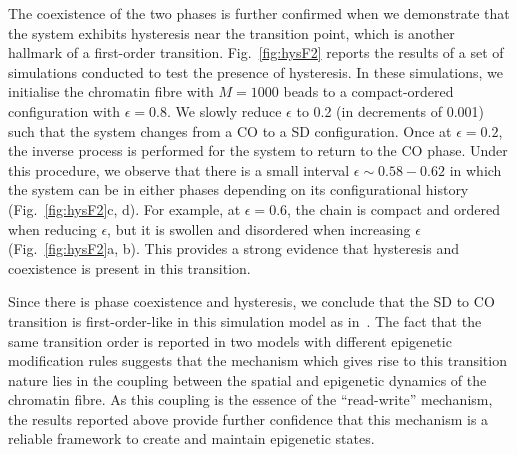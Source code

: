 \documentclass[12pt]{article}
\begin{document}
The coexistence of the two phases is further confirmed when we demonstrate that the system exhibits hysteresis near the transition point, which is another hallmark of a first-order transition. Fig.~\ref{fig:hysF2} reports the results of a set of simulations conducted to test the presence of hysteresis. In these simulations, we initialise the chromatin fibre with $M = 1000$ beads to a compact-ordered configuration with $\epsilon = 0.8$. We slowly reduce $\epsilon$ to 0.2 (in decrements of 0.001) such that the system changes from a CO to a SD configuration. Once at $\epsilon = 0.2$, the inverse process is performed for the system to return to the CO phase. Under this procedure, we observe that there is a small interval $\epsilon \sim 0.58 - 0.62$ in which the system can be in either phases depending on its configurational history (Fig.~\ref{fig:hysF2}c, d). For example, at $\epsilon = 0.6$, the chain is compact and ordered when reducing $\epsilon$, but it is swollen and disordered when increasing $\epsilon$ (Fig.~\ref{fig:hysF2}a, b). This provides a strong evidence that hysteresis and coexistence is present in this transition.

Since there is phase coexistence and hysteresis, we conclude that the SD to CO transition is first-order-like in this simulation model as in~\cite{michieletto2016}. The fact that the same transition order is reported in two models with different epigenetic modification rules suggests that the mechanism which gives rise to this transition nature lies in the coupling between the spatial and epigenetic dynamics of the chromatin fibre. As this coupling is the essence of the ``read-write'' mechanism, the results reported above provide further confidence that this mechanism is a reliable framework to create and maintain epigenetic states. 

\FloatBarrier
\end{document}
